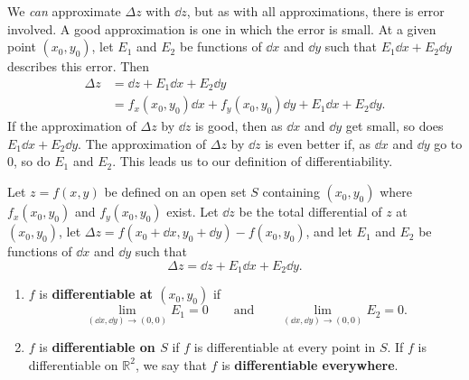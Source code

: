 We \emph{can} approximate $\Delta z$ with $\dd z$, but as with all approximations, there is error involved. A good approximation is one in which the error is small. At a given point $(x_0,y_0)$, let $E_1$ and $E_2$ be functions of $\dd x$ and $\dd y$ such that $E_1\dd x+E_2\dd y$ describes this error. Then
\begin{align*}
\Delta z &= \dd z + E_1\dd x+ E_2\dd y \\
		&= f_x(x_0,y_0)\dd x+f_y(x_0,y_0)\dd y + E_1\dd x+E_2\dd y.
\end{align*}
If the approximation of $\Delta z$ by $\dd z$ is good, then as $\dd x$ and $\dd y$ get small,  so does $E_1\dd x+E_2\dd y$. The approximation of $\Delta z$ by $\dd z$ is even better if, as $\dd x$ and $\dd y$ go to 0, so do $E_1$ and $E_2$. This leads us to our definition of differentiability.

\begin{definition}\label{def:multi_differentiability}
Let $z=f(x,y)$ be defined on an open set $S$ containing $(x_0,y_0)$ where $f_x(x_0,y_0)$ and $f_y(x_0,y_0)$ exist. Let $\dd z$ be the total differential of $z$ at $(x_0,y_0)$, let $\Delta z = f(x_0+\dd x,y_0+\dd y) - f(x_0,y_0)$, and let $E_1$ and $E_2$ be functions of $\dd x$ and $\dd y$ such that 
\[\Delta z = \dd z + E_1\dd x + E_2\dd y.\]
\begin{enumerate}
	\item $f$ is \textbf{differentiable at $(x_0,y_0)$} if%
	\[\lim_{(\dd x,\dd y)\to(0,0)}E_1=0\qquad\text{and}\qquad\lim_{(\dd x,\dd y)\to(0,0)}E_2=0.\]
	\item $f$ is \textbf{differentiable on $S$} if $f$ is differentiable at every point in $S$. If $f$ is differentiable on $\mathbb{R}^2$, we say that $f$ is \textbf{differentiable everywhere}.
\end{enumerate}
\end{definition}

